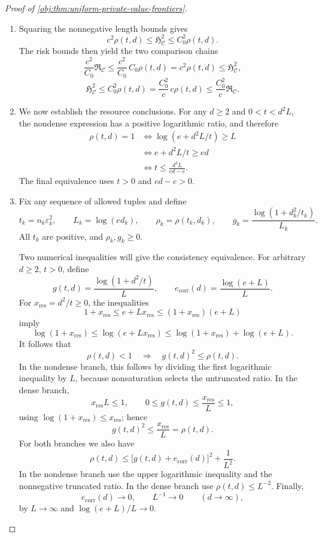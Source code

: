 \begin{proof}[Proof of \cref{obj:thm:uniform-private-value-frontiers}]
\begin{enumerate}
\item
Squaring the nonnegative length bounds gives
\[
c^2\rho(t,d)\le\mathfrak H_{\mathcal C}^2
\le C_0^2\rho(t,d).
\]
The risk bounds then yield the two comparison chains
\[
\frac{c^2}{C_0}\mathfrak R_{\mathcal C}
\le\frac{c^2}{C_0}\,C_0\rho(t,d)
=c^2\rho(t,d)
\le\mathfrak H_{\mathcal C}^2,
\]
\[
\mathfrak H_{\mathcal C}^2
\le C_0^2\rho(t,d)
=\frac{C_0^2}{c}\,c\rho(t,d)
\le\frac{C_0^2}{c}\mathfrak R_{\mathcal C}.
\]

\item
We now establish the resource conclusions. For any \(d\ge2\) and
\(0<t<d^2L\), the nondense expression has a positive logarithmic ratio, and therefore
\[
\begin{aligned}
\rho(t,d)=1
&\iff \log(e+d^2L/t)\ge L\\
&\iff e+d^2L/t\ge ed\\
&\iff t\le\frac{d^2L}{ed-e}.
\end{aligned}
\]
The final equivalence uses \(t>0\) and \(ed-e>0\).

\item
Fix any sequence of allowed tuples and define
\[
t_k=n_k\varepsilon_k^2,\qquad
L_k=\log(ed_k),\qquad
\rho_k=\rho(t_k,d_k),\qquad
g_k=\frac{\log(1+d_k^2/t_k)}{L_k}.
\]
All \(t_k\) are positive, and \(\rho_k,g_k\ge0\).

Two numerical inequalities will give the consistency equivalence. For arbitrary \(d\ge2\), \(t>0\), define
\[
g(t,d)=\frac{\log(1+d^2/t)}{L},
\qquad
e_{\mathrm{corr}}(d)=\frac{\log(e+L)}{L}.
\]
For \(x_{\mathrm{res}}=d^2/t\ge0\), the inequalities
\[
1+x_{\mathrm{res}}\le e+Lx_{\mathrm{res}}
\le(1+x_{\mathrm{res}})(e+L)
\]
imply
\[
\log(1+x_{\mathrm{res}})
\le\log(e+Lx_{\mathrm{res}})
\le\log(1+x_{\mathrm{res}})+\log(e+L).
\]
It follows that
\[
\rho(t,d)<1\quad\Longrightarrow\quad
g(t,d)^2\le\rho(t,d).
\]
In the nondense branch, this follows by dividing the first logarithmic inequality by \(L\), because nonsaturation selects the untruncated ratio. In the dense branch,
\[
x_{\mathrm{res}}L\le1,\qquad
0\le g(t,d)\le\frac{x_{\mathrm{res}}}{L}\le1,
\]
using \(\log(1+x_{\mathrm{res}})\le x_{\mathrm{res}}\); hence
\[
g(t,d)^2\le\frac{x_{\mathrm{res}}}{L}=\rho(t,d).
\]
For both branches we also have
\[
\rho(t,d)
\le\bigl[g(t,d)+e_{\mathrm{corr}}(d)\bigr]^2+\frac1{L^2}.
\]
In the nondense branch use the upper logarithmic inequality and the nonnegative truncated ratio. In the dense branch use
\(\rho(t,d)\le L^{-2}\).
Finally,
\[
e_{\mathrm{corr}}(d)\longrightarrow0,
\qquad
L^{-1}\longrightarrow0
\qquad(d\longrightarrow\infty),
\]
by \(L\to\infty\) and \(\log(e+L)/L\to0\).


\end{enumerate}
\end{proof}
